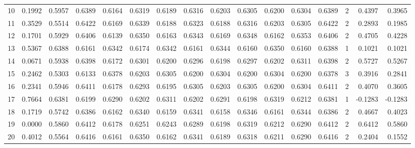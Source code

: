 \begin{tabular}{lrrrrrrrrrrrrrrr}
10  &      0.1992 &  0.5957 &  0.6389 &  0.6164 &  0.6319 &  0.6189 &  0.6316 &  0.6203 &  0.6305 &  0.6200 &   0.6304 &     0.6389 &      2 &                    0.4397 &                     0.3965 \\
11  &      0.3529 &  0.5514 &  0.6422 &  0.6169 &  0.6339 &  0.6188 &  0.6323 &  0.6188 &  0.6316 &  0.6203 &   0.6305 &     0.6422 &      2 &                    0.2893 &                     0.1985 \\
12  &      0.1701 &  0.5929 &  0.6406 &  0.6139 &  0.6350 &  0.6163 &  0.6343 &  0.6169 &  0.6348 &  0.6162 &   0.6353 &     0.6406 &      2 &                    0.4705 &                     0.4228 \\
13  &      0.5367 &  0.6388 &  0.6161 &  0.6342 &  0.6174 &  0.6342 &  0.6161 &  0.6344 &  0.6160 &  0.6350 &   0.6160 &     0.6388 &      1 &                    0.1021 &                     0.1021 \\
14  &      0.0671 &  0.5938 &  0.6398 &  0.6172 &  0.6301 &  0.6200 &  0.6296 &  0.6198 &  0.6297 &  0.6202 &   0.6311 &     0.6398 &      2 &                    0.5727 &                     0.5267 \\
15  &      0.2462 &  0.5303 &  0.6133 &  0.6378 &  0.6203 &  0.6305 &  0.6200 &  0.6304 &  0.6200 &  0.6304 &   0.6200 &     0.6378 &      3 &                    0.3916 &                     0.2841 \\
16  &      0.2341 &  0.5946 &  0.6411 &  0.6178 &  0.6293 &  0.6195 &  0.6305 &  0.6203 &  0.6305 &  0.6200 &   0.6304 &     0.6411 &      2 &                    0.4070 &                     0.3605 \\
17  &      0.7664 &  0.6381 &  0.6199 &  0.6290 &  0.6202 &  0.6311 &  0.6202 &  0.6291 &  0.6198 &  0.6319 &   0.6212 &     0.6381 &      1 &                   -0.1283 &                    -0.1283 \\
18  &      0.1719 &  0.5742 &  0.6386 &  0.6162 &  0.6340 &  0.6159 &  0.6341 &  0.6158 &  0.6346 &  0.6161 &   0.6344 &     0.6386 &      2 &                    0.4667 &                     0.4023 \\
19  &      0.0000 &  0.5860 &  0.6412 &  0.6178 &  0.6251 &  0.6243 &  0.6289 &  0.6198 &  0.6319 &  0.6212 &   0.6290 &     0.6412 &      2 &                    0.6412 &                     0.5860 \\
20  &      0.4012 &  0.5564 &  0.6416 &  0.6161 &  0.6350 &  0.6162 &  0.6341 &  0.6189 &  0.6318 &  0.6211 &   0.6290 &     0.6416 &      2 &                    0.2404 &                     0.1552 \\

\end{tabular}
